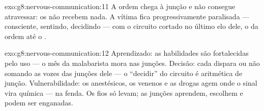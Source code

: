 \begin{solution}{exo:g8:nervous-communication:11}
A ordem chega à junção e não consegue atravessar: os  não
recebem nada. A vítima fica progressivamente paralisada --- consciente,
sentindo, decidindo --- com o circuito cortado no último elo dele, o da
ordem até o .
\end{solution}

\begin{solution}{exo:g8:nervous-communication:12}
Aprendizado: as habilidades são  fortalecidas pelo uso --- o
mês da malabarista mora nas junções. Decisão: cada  dispara ou
não somando as vozes das junções dele --- o ``decidir'' do circuito é
aritmética de junção. Vulnerabilidade: os anestésicos, os venenos e as
drogas agem onde o sinal vira química --- na fenda. Os fios só levam;
as junções aprendem, escolhem e podem ser enganadas.
\end{solution}

